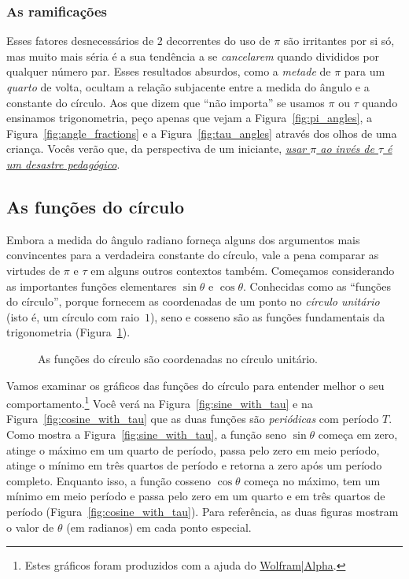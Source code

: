     \subsubsection{As ramificações} %
    \label{sec:the_ramifications}


Esses fatores desnecessários de $2$ decorrentes do uso de $\pi$ são irritantes por si só, mas muito mais séria é a sua tendência a se \emph{cancelarem} quando divididos por qualquer número par. Esses resultados absurdos, como a \emph{metade} de $\pi$ para um \emph{quarto} de volta, ocultam a relação subjacente entre a medida do ângulo e a constante do círculo. Aos que dizem que ``não importa'' se usamos $\pi$ ou $\tau$ quando ensinamos trigonometria, peço apenas que vejam a Figura~\ref{fig:pi_angles}, a Figura~\ref{fig:angle_fractions} e a Figura~\ref{fig:tau_angles} através dos olhos de uma criança. Vocês verão que, da perspectiva de um iniciante, \href{https://tauday.com/a-tau-testimonial}{\emph{usar $\pi$ ao invés de $\tau$ é um desastre pedagógico}}.

  \subsection{As funções do círculo} %
  \label{sec:the_circle_functions}

Embora a medida do ângulo radiano forneça alguns dos argumentos mais convincentes para a verdadeira constante do círculo, vale a pena comparar as virtudes de $\pi$ e $\tau$ em alguns outros contextos também. Começamos considerando as importantes funções elementares $\sin\theta$ e $\cos\theta$. Conhecidas como as ``funções do círculo'', porque fornecem as coordenadas de um ponto no \emph{círculo unitário} (isto é, um círculo com raio~$1$), seno e cosseno são as funções fundamentais da trigonometria (Figura~\ref{fig:circle_functions}).

\begin{figure}
\begin{center}
\end{center}
\caption{As funções do círculo são coordenadas no círculo unitário.\label{fig:circle_functions}}
\end{figure}

Vamos examinar os gráficos das funções do círculo para entender melhor o seu comportamento.\footnote{Estes gráficos foram produzidos com a ajuda do \href{https://www.wolframalpha.com/}{Wolfram|Alpha}.} Você verá na Figura~\ref{fig:sine_with_tau} e na Figura~\ref{fig:cosine_with_tau} que as duas funções são \emph{periódicas} com período $T$. Como mostra a Figura~\ref{fig:sine_with_tau}, a função seno $\sin\theta$ começa em zero, atinge o máximo em um quarto de período, passa pelo zero em meio período, atinge o mínimo em três quartos de período e retorna a zero após um período completo. Enquanto isso, a função cosseno $\cos\theta$ começa no máximo, tem um mínimo em meio período e passa pelo zero em um quarto e em três quartos de período (Figura~\ref{fig:cosine_with_tau}). Para referência, as duas figuras mostram o valor de $\theta$ (em radianos) em cada ponto especial.

